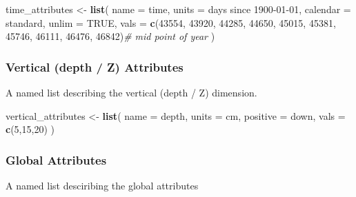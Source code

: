 \documentclass[
]{article}
\newenvironment{Shaded}{\begin{snugshade}}{\end{snugshade}}
\newcommand{\CommentTok}[1]{\textcolor[rgb]{0.56,0.35,0.01}{\textit{#1}}}
\newcommand{\DataTypeTok}[1]{\textcolor[rgb]{0.13,0.29,0.53}{#1}}
\newcommand{\DecValTok}[1]{\textcolor[rgb]{0.00,0.00,0.81}{#1}}
\newcommand{\KeywordTok}[1]{\textcolor[rgb]{0.13,0.29,0.53}{\textbf{#1}}}
\newcommand{\NormalTok}[1]{#1}
\newcommand{\OtherTok}[1]{\textcolor[rgb]{0.56,0.35,0.01}{#1}}
\newcommand{\StringTok}[1]{\textcolor[rgb]{0.31,0.60,0.02}{#1}}
\begin{document}
\begin{Shaded}
\begin{Highlighting}[]
\NormalTok{time\_attributes \textless{}{-}}\StringTok{ }\KeywordTok{list}\NormalTok{(}
  \DataTypeTok{name =} \StringTok{\textquotesingle{}time\textquotesingle{}}\NormalTok{,}
  \DataTypeTok{units =} \StringTok{\textquotesingle{}days since 1900{-}01{-}01\textquotesingle{}}\NormalTok{,}
  \DataTypeTok{calendar =} \StringTok{\textquotesingle{}standard\textquotesingle{}}\NormalTok{,}
  \DataTypeTok{unlim =} \OtherTok{TRUE}\NormalTok{,}
  \DataTypeTok{vals =} \KeywordTok{c}\NormalTok{(}\DecValTok{43554}\NormalTok{, }\DecValTok{43920}\NormalTok{, }\DecValTok{44285}\NormalTok{, }\DecValTok{44650}\NormalTok{, }\DecValTok{45015}\NormalTok{, }\DecValTok{45381}\NormalTok{, }\DecValTok{45746}\NormalTok{, }\DecValTok{46111}\NormalTok{, }\DecValTok{46476}\NormalTok{, }\DecValTok{46842}\NormalTok{)}\CommentTok{\# mid point of year}
\NormalTok{  )}
\end{Highlighting}
\end{Shaded}

\hypertarget{vertical-depth-z-attributes}{%
\subsubsection{Vertical (depth / Z) Attributes}\label{vertical-depth-z-attributes}}

A named list describing the vertical (depth / Z) dimension.

\begin{Shaded}
\begin{Highlighting}[]
\NormalTok{vertical\_attributes \textless{}{-}}\StringTok{ }\KeywordTok{list}\NormalTok{(}
  \DataTypeTok{name =} \StringTok{\textquotesingle{}depth\textquotesingle{}}\NormalTok{,}
  \DataTypeTok{units =} \StringTok{\textquotesingle{}cm\textquotesingle{}}\NormalTok{,}
  \DataTypeTok{positive =} \StringTok{\textquotesingle{}down\textquotesingle{}}\NormalTok{,}
  \DataTypeTok{vals =} \KeywordTok{c}\NormalTok{(}\DecValTok{5}\NormalTok{,}\DecValTok{15}\NormalTok{,}\DecValTok{20}\NormalTok{)}
\NormalTok{)}
\end{Highlighting}
\end{Shaded}

\hypertarget{global-attributes}{%
\subsubsection{Global Attributes}\label{global-attributes}}

A named list desciribing the global attributes
\end{document}
